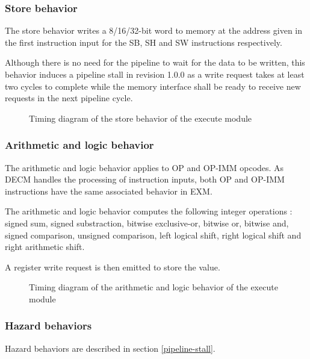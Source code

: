       

    \subsubsection{Store behavior}

      \begin{content}
          The store behavior writes a 8/16/32-bit word to memory at the address given in the first instruction input for the SB, SH and SW instructions respectively.

          Although there is no need for the pipeline to wait for the data to be written, this behavior induces a pipeline stall in revision 1.0.0 as a write request takes at least two cycles to complete while the memory interface shall be ready to receive new requests in the next pipeline cycle.
        \end{content}

      \begin{figure}[H]
          \centering
          
          \caption{Timing diagram of the store behavior of the execute module}
          \label{fig:exm-behavior-store}
        \end{figure}

      

    \subsubsection{Arithmetic and logic behavior}

      \begin{content}
          The arithmetic and logic behavior applies to OP and OP-IMM opcodes. As DECM handles the processing of instruction inputs, both OP and OP-IMM instructions have the same associated behavior in EXM.

          The arithmetic and logic behavior computes the following integer operations : signed sum, signed substraction, bitwise exclusive-or, bitwise or, bitwise and, signed comparison, unsigned comparison, left logical shift, right logical shift and right arithmetic shift.
          
          A register write request is then emitted to store the value.
        \end{content}

      \begin{figure}[H]
          \centering
          
          \caption{Timing diagram of the arithmetic and logic behavior of the execute module}
          \label{fig:exm-behavior-arithmetic-logic}
        \end{figure}

      

    \subsubsection{Hazard behaviors}

      \begin{content}
          Hazard behaviors are described in section \ref{pipeline-stall}.
        \end{content}

\newpage
